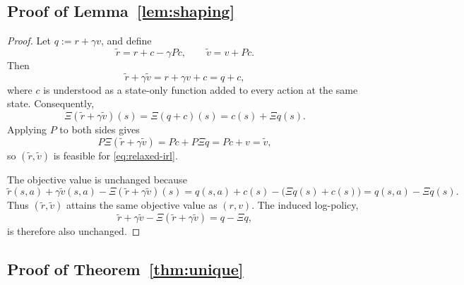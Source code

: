 \documentclass{article}
\newcommand{\1}{\mathbbm{1}}
\begin{document}
\subsection{Proof of Lemma~\ref{lem:shaping}}

\begin{proof}
Let \(q:=r+\gamma v\), and define
\[
\tilde r=r+c-\gamma Pc,
\qquad
\tilde v=v+Pc.
\]
Then
\[
\tilde r+\gamma \tilde v
=
r+\gamma v + c
=
q+c,
\]
where \(c\) is understood as a state-only function added to every action at
the same state. Consequently,
\[
\Xi(\tilde r+\gamma\tilde v)(s)
=
\Xi(q+c)(s)
=
c(s)+\Xi q(s).
\]
Applying \(P\) to both sides gives
\[
P\Xi(\tilde r+\gamma\tilde v)
=
Pc + P\Xi q
=
Pc + v
=
\tilde v,
\]
so \((\tilde r,\tilde v)\) is feasible for \eqref{eq:relaxed-irl}.

The objective value is unchanged because
\[
\tilde r(s,a)+\gamma \tilde v(s,a)-\Xi(\tilde r+\gamma\tilde v)(s)
=
q(s,a)+c(s)-\bigl(\Xi q(s)+c(s)\bigr)
=
q(s,a)-\Xi q(s).
\]
Thus \((\tilde r,\tilde v)\) attains the same objective value as \((r,v)\).
The induced log-policy,
\[
\tilde r+\gamma \tilde v-\Xi(\tilde r+\gamma\tilde v)
=
q-\Xi q,
\]
is therefore also unchanged.
\end{proof}

\subsection{Proof of Theorem~\ref{thm:unique}}
\end{document}
